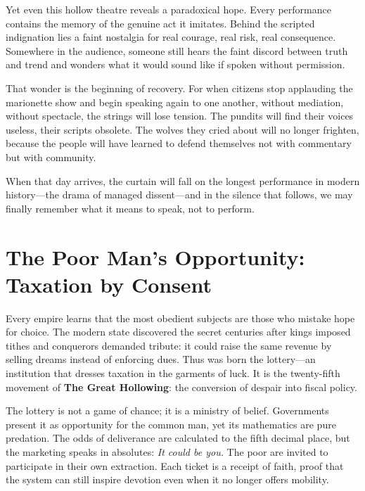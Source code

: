 \documentclass[11pt,twoside]{book}
\begin{document}
Yet even this hollow theatre reveals a paradoxical hope.  
Every performance contains the memory of the genuine act it imitates.  
Behind the scripted indignation lies a faint nostalgia for real courage, real risk, real consequence.  
Somewhere in the audience, someone still hears the faint discord between truth and trend and wonders what it would sound like if spoken without permission.

That wonder is the beginning of recovery.  
For when citizens stop applauding the marionette show and begin speaking again to one another, without mediation, without spectacle, the strings will lose tension.  
The pundits will find their voices useless, their scripts obsolete.  
The wolves they cried about will no longer frighten, because the people will have learned to defend themselves not with commentary but with community.

When that day arrives, the curtain will fall on the longest performance in modern history—the drama of managed dissent—and in the silence that follows, we may finally remember what it means to speak, not to perform.

%
\chapter{The Poor Man’s Opportunity: Taxation by Consent}
\label{ch:25.2}

Every empire learns that the most obedient subjects are those who mistake hope for choice.  
The modern state discovered the secret centuries after kings imposed tithes and conquerors demanded tribute: it could raise the same revenue by selling dreams instead of enforcing dues.  
Thus was born the lottery—an institution that dresses taxation in the garments of luck.  
It is the twenty-fifth movement of \textbf{The Great Hollowing}: the conversion of despair into fiscal policy.

The lottery is not a game of chance; it is a ministry of belief.  
Governments present it as opportunity for the common man, yet its mathematics are pure predation.  
The odds of deliverance are calculated to the fifth decimal place, but the marketing speaks in absolutes:  
\emph{It could be you.}  
The poor are invited to participate in their own extraction.  
Each ticket is a receipt of faith, proof that the system can still inspire devotion even when it no longer offers mobility.
\end{document}
